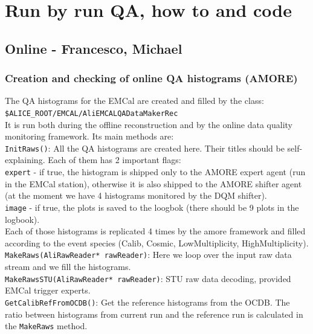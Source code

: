 \section{Run by run QA, how to and code}
\subsection{Online - Francesco, Michael}

\subsubsection{Creation and checking of online QA histograms (AMORE)}
The QA histograms for the EMCal are created and filled by the class:\\ 
\texttt{\$ALICE\_ROOT/EMCAL/AliEMCALQADataMakerRec}\\
It is run both during the offline reconstruction and by the online data quality monitoring framework. Its main methods are:\\

\texttt{InitRaws()}:
All the QA histograms are created here. Their titles should be self-explaining. Each of them has 2 important flags:\\
\texttt{expert} - if true, the histogram is shipped only to the AMORE expert agent (run in the EMCal station), otherwise it is also shipped to the AMORE shifter agent (at the moment we have 4 histograms monitored by the DQM shifter).\\
\texttt{image} - if true, the plots is saved to the loogbok (there should be 9 plots in the logbook).\\
Each of those histograms is replicated 4 times by the amore framework and filled according to the event species (Calib, Cosmic, LowMultiplicity, HighMultiplicity).\\

\texttt{MakeRaws(AliRawReader* rawReader)}:
Here we loop over the input raw data stream and we fill the histograms.\\

\texttt{MakeRawsSTU(AliRawReader* rawReader)}:
STU raw data decoding, provided EMCal trigger experts.\\

\texttt{GetCalibRefFromOCDB()}:
Get the reference histograms from the OCDB. The ratio between histograms from current run and the reference run is calculated in the \texttt{MakeRaws} method.\\


